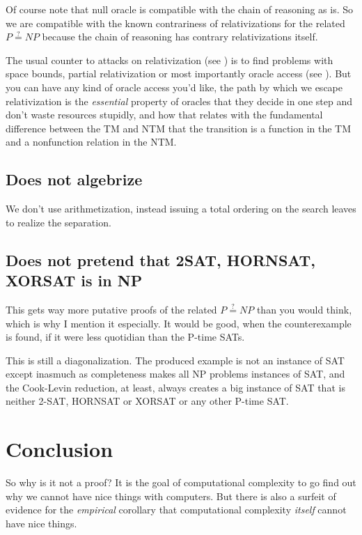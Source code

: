 \documentclass{article}
\begin{document}
Of course note that null oracle is compatible with the chain of reasoning as is. So we are compatible with the known contrariness of relativizations for the related $P \stackrel{?}{=} NP$ because the chain of reasoning has contrary relativizations itself.

The usual counter to attacks on relativization (see \cite{arora}) is to find problems with space bounds, partial relativization or most importantly oracle access (see \cite{fortnowrelativization}). But you can have any kind of oracle access you'd like, the path by which we escape relativization is the \textit{essential} property of oracles that they decide in one step and don't waste resources stupidly, and how that relates with the fundamental difference between the TM and NTM that the transition is a function in the TM and a nonfunction relation in the NTM.

\subsection{Does not algebrize}

We don't use arithmetization, instead issuing a total ordering on the search leaves to realize the separation.

\subsection{Does not pretend that 2SAT, HORNSAT, XORSAT is in NP}

This gets way more putative proofs of the related $P \stackrel{?}{=} NP$ than you would think, which is why I mention it especially. It would be good, when the counterexample is found, if it were less quotidian than the P-time SATs.

This is still a diagonalization. The produced example is not an instance of SAT except inasmuch as completeness makes all NP problems instances of SAT, and the Cook-Levin reduction, at least, always creates a big instance of SAT that is neither 2-SAT, HORNSAT or XORSAT or any other P-time SAT.

\section{Conclusion}

So why is it not a proof? It is the goal of computational complexity to go find out why we cannot have nice things with computers. But there is also a surfeit of evidence for the \textit{empirical} corollary that computational complexity \textit{itself} cannot have nice things.
\end{document}
